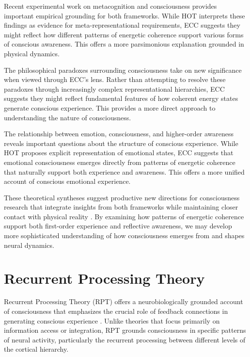 \begin{refsection}
Recent experimental work on metacognition and consciousness \cite{Brown2019} provides important empirical grounding for both frameworks. While HOT interprets these findings as evidence for meta-representational requirements, ECC suggests they might reflect how different patterns of energetic coherence support various forms of conscious awareness. This offers a more parsimonious explanation grounded in physical dynamics.

The philosophical paradoxes surrounding consciousness \cite{Gennaro2012} take on new significance when viewed through ECC's lens. Rather than attempting to resolve these paradoxes through increasingly complex representational hierarchies, ECC suggests they might reflect fundamental features of how coherent energy states generate conscious experience. This provides a more direct approach to understanding the nature of consciousness.

The relationship between emotion, consciousness, and higher-order awareness \cite{LeDoux2017} reveals important questions about the structure of conscious experience. While HOT proposes explicit representation of emotional states, ECC suggests that emotional consciousness emerges directly from patterns of energetic coherence that naturally support both experience and awareness. This offers a more unified account of conscious emotional experience.

These theoretical syntheses suggest productive new directions for consciousness research that integrate insights from both frameworks while maintaining closer contact with physical reality \cite{Rosenthal2019}. By examining how patterns of energetic coherence support both first-order experience and reflective awareness, we may develop more sophisticated understanding of how consciousness emerges from and shapes neural dynamics.

\section{Recurrent Processing Theory}

Recurrent Processing Theory (RPT) offers a neurobiologically grounded account of consciousness that emphasizes the crucial role of feedback connections in generating conscious experience \cite{Lamme2006}. Unlike theories that focus primarily on information access or integration, RPT grounds consciousness in specific patterns of neural activity, particularly the recurrent processing between different levels of the cortical hierarchy.


\end{refsection}
